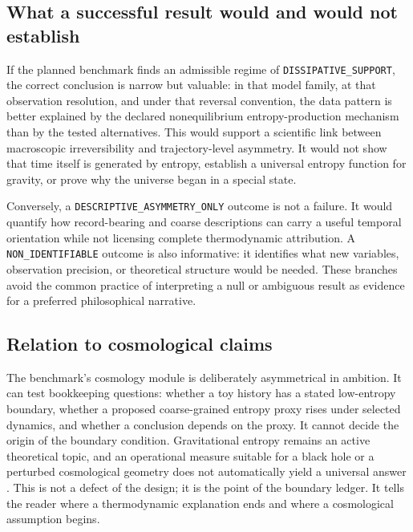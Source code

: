 \subsection{What a successful result would and would not establish}

If the planned benchmark finds an admissible regime of \texttt{DISSIPATIVE\_SUPPORT}, the correct conclusion is narrow but valuable: in that model family, at that observation resolution, and under that reversal convention, the data pattern is better explained by the declared nonequilibrium entropy-production mechanism than by the tested alternatives. This would support a scientific link between macroscopic irreversibility and trajectory-level asymmetry. It would not show that time itself is generated by entropy, establish a universal entropy function for gravity, or prove why the universe began in a special state.

Conversely, a \texttt{DESCRIPTIVE\_ASYMMETRY\_ONLY} outcome is not a failure. It would quantify how record-bearing and coarse descriptions can carry a useful temporal orientation while not licensing complete thermodynamic attribution. A \texttt{NON\_IDENTIFIABLE} outcome is also informative: it identifies what new variables, observation precision, or theoretical structure would be needed. These branches avoid the common practice of interpreting a null or ambiguous result as evidence for a preferred philosophical narrative.

\subsection{Relation to cosmological claims}

The benchmark's cosmology module is deliberately asymmetrical in ambition. It can test bookkeeping questions: whether a toy history has a stated low-entropy boundary, whether a proposed coarse-grained entropy proxy rises under selected dynamics, and whether a conclusion depends on the proxy. It cannot decide the origin of the boundary condition. Gravitational entropy remains an active theoretical topic, and an operational measure suitable for a black hole or a perturbed cosmological geometry does not automatically yield a universal answer \cite{clifton_ellis_tavakol2013}. This is not a defect of the design; it is the point of the boundary ledger. It tells the reader where a thermodynamic explanation ends and where a cosmological assumption begins.



